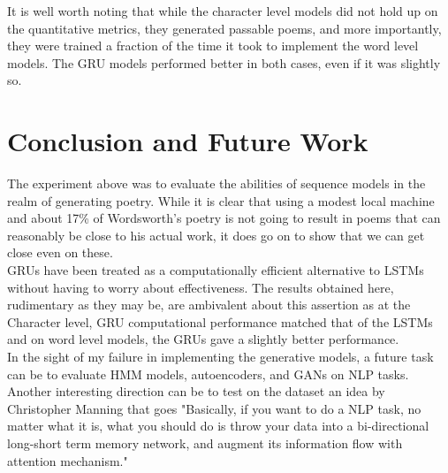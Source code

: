 \documentclass[15pt]{article}
\begin{document}
It is well worth noting that while the character level models did not hold up on the quantitative metrics, they generated passable poems, and more importantly, they were trained a fraction of the time it took to implement the word level models. The GRU models performed better in both cases, even if it was slightly so.

\section{Conclusion and Future Work}
The experiment above was to evaluate the abilities of sequence models in the realm of generating poetry. While it is clear that using a modest local machine and about 17\% of Wordsworth's poetry  is not going to result in poems that can reasonably be close to his actual work, it does go on to show that we can get close even on these. 
\\
GRUs have been treated as a computationally efficient alternative to LSTMs without having to worry about effectiveness. The results obtained here, rudimentary as they may be, are ambivalent about this assertion as at the Character level, GRU computational performance matched that of the LSTMs and on word level models, the GRUs gave a slightly better performance.
\\
In the sight of my failure in implementing the generative models, a future task can be to evaluate HMM models, autoencoders, and GANs on NLP tasks. Another interesting direction can be to test on the dataset an idea by Christopher Manning that goes "Basically, if you want to do a NLP task, no matter what it is, what you should do is throw your data into a bi-directional long-short term memory network, and augment its information flow with attention mechanism."
\end{document}

